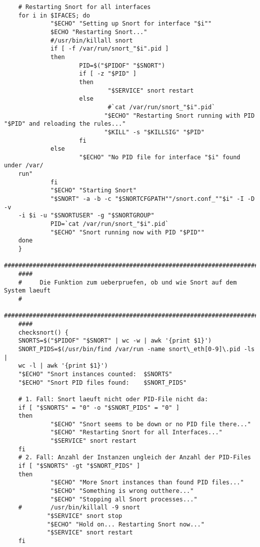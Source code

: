 \documentclass{article}
\begin{document}
\begin{verbatim}
    # Restarting Snort for all interfaces
    for i in $IFACES; do
             "$ECHO" "Setting up Snort for interface "$i""
             $ECHO "Restarting Snort..."
             #/usr/bin/killall snort
             if [ -f /var/run/snort_"$i".pid ]
             then
                     PID=$("$PIDOF" "$SNORT")
                     if [ -z "$PID" ]
                     then
                             "$SERVICE" snort restart
                     else
                             #`cat /var/run/snort_"$i".pid`
                            "$ECHO" "Restarting Snort running with PID "$PID" and reloading the rules..."
                            "$KILL" -s "$KILLSIG" "$PID"
                     fi
             else
                     "$ECHO" "No PID file for interface "$i" found under /var/
    run"
             fi
             "$ECHO" "Starting Snort"
             "$SNORT" -a -b -c "$SNORTCFGPATH""/snort.conf_""$i" -I -D -v 
    -i $i -u "$SNORTUSER" -g "$SNORTGROUP"
             PID=`cat /var/run/snort_"$i".pid`
             "$ECHO" "Snort running now with PID "$PID""
    done
    }
    ###########################################################################
    ####
    #     Die Funktion zum ueberpruefen, ob und wie Snort auf dem System laeuft     
    #
    ###########################################################################
    ####
    checksnort() {
    SNORTS=$("$PIDOF" "$SNORT" | wc -w | awk '{print $1}')
    SNORT_PIDS=$(/usr/bin/find /var/run -name snort\_eth[0-9]\.pid -ls | 
    wc -l | awk '{print $1}')
    "$ECHO" "Snort instances counted:  $SNORTS"
    "$ECHO" "Snort PID files found:    $SNORT_PIDS"
    
    # 1. Fall: Snort laeuft nicht oder PID-File nicht da:
    if [ "$SNORTS" = "0" -o "$SNORT_PIDS" = "0" ]
    then
             "$ECHO" "Snort seems to be down or no PID file there..."
             "$ECHO" "Restarting Snort for all Interfaces..."
             "$SERVICE" snort restart
    fi
    # 2. Fall: Anzahl der Instanzen ungleich der Anzahl der PID-Files
    if [ "$SNORTS" -gt "$SNORT_PIDS" ]
    then
             "$ECHO" "More Snort instances than found PID files..."
             "$ECHO" "Something is wrong outthere..."
             "$ECHO" "Stopping all Snort processes..."
    #        /usr/bin/killall -9 snort
            "$SERVICE" snort stop
            "$ECHO" "Hold on... Restarting Snort now..."
            "$SERVICE" snort restart
    fi
     

\end{verbatim}
\end{document}
